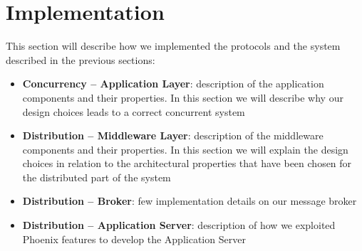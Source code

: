 \section{Implementation}\label{}

This section will describe how we implemented the protocols and the system
described in the previous sections:

\begin{itemize}
\item \textbf{Concurrency -- Application Layer}:
  description of the application components and their properties. In this
  section we will describe why our design choices leads to a correct concurrent
  system
\item \textbf{Distribution -- Middleware Layer}:
  description of the middleware components and their properties. In this
  section we will explain the design choices in relation to the architectural
  properties that have been chosen for the distributed part of the system
\item \textbf{Distribution -- Broker}:
  few implementation details on our message broker
\item \textbf{Distribution -- Application Server}:
  description of how we exploited Phoenix features to develop the Application
  Server
\end{itemize}








